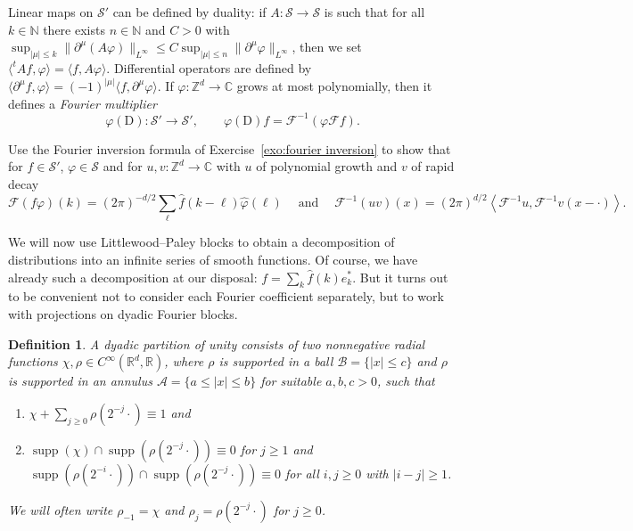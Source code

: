 \documentclass[a4paper,11pt]{article}
\newcommand{\cdummy}{\cdot}
\newcommand{\mathD}{\mathrm{D}}
\newcommand{\nosymbol}{}
\newcommand{\tmop}[1]{\ensuremath{\operatorname{#1}}}
\newcommand{\tmtextit}[1]{{\itshape{#1}}}
\newtheorem{definition}{Definition}
{\theorembodyfont{\rmfamily}\newtheorem{example}{Example}}
{\theorembodyfont{\rmfamily\small}\newtheorem{exercise}{Exercise}}
\newcommand{\CA}{\mathscr{A}}
\newcommand{\CB}{\mathscr{B}}
\newcommand{\CF}{\mathscr{F}}
\newcommand{\CS}{\mathscr{S}}
\begin{document}
Linear maps on $\CS'$ can be defined by duality: if $A : \CS \rightarrow \CS$
is such that for all $k \in \mathbb{N}$ there exists $n \in \mathbb{N}$ and
$C > 0$ with $\sup_{| {\mu} | \leqslant k} \| \partial^{{\mu}} (A
\varphi) \|_{L^{\infty}} \leqslant C \sup_{| {\mu} | \leqslant n} \|
\partial^{{\mu}} \varphi \|_{L^{\infty}}$, then we set $\langle^t A f,
\varphi \rangle = \langle f, A \varphi \rangle$. Differential operators are
defined by $\langle \partial^{{\mu}} f, \varphi \rangle = (- 1)^{|
{\mu} |} \langle f, \partial^{{\mu}} \varphi \rangle$. If $\varphi :
\mathbb{Z}^d \rightarrow \mathbb{C}$ grows at most polynomially, then it
defines a \tmtextit{Fourier multiplier}
\[
   \varphi (\mathD) : \CS' \rightarrow \CS', \hspace{2em} \varphi (\mathD) f = \CF^{- 1} ( \varphi \CF f ).
\]
\begin{exercise}
  \label{exercise:convolution}Use the Fourier inversion formula of
  Exercise~\ref{exo:fourier inversion} to show that for $f \in \CS'$, $\varphi
  \in \CS$ and for $u, v : \mathbb{Z}^d \rightarrow \mathbb{C}$ with $u$ of
  polynomial growth and $v$ of rapid decay
  \[ \CF (f \varphi) (k) = (2 \pi)^{- d / 2} \sum_{\ell} \hat{f} (k - \ell)
     \hat{\varphi} (\ell) \hspace{1em} \tmop{and} \hspace{1em} \CF^{- 1} (u v)
     (x) = (2 \pi)^{d / 2} \left\langle \CF^{- 1} u, \CF^{- 1} v (x - \cdot)
     \right\rangle . \]
\end{exercise}

We will now use Littlewood--Paley blocks to obtain a decomposition of
distributions into an infinite series of smooth functions. Of course, we have
already such a decomposition at our disposal: $f = \sum_k \hat{f} (k)
e^{\ast}_k$. But it turns out to be convenient not to consider each Fourier
coefficient separately, but to work with projections on dyadic Fourier blocks.

\begin{definition}
  A \tmtextit{dyadic partition of unity} consists of two nonnegative radial
  functions $\chi, \rho \in C^{\infty} (\mathbb{R}^d, \mathbb{R})$, where
  $\rho$ is supported in a ball $\CB = \{ | x | \leqslant c \}$ and $\rho$ is
  supported in an annulus $\CA = \{ a \leqslant | x | \leqslant b \}$ for
  suitable $a, b, c > 0$, such that
  \begin{enumerate}
    \item $\chi + \sum_{j \geqslant 0} \rho (2^{- j} \cdummy) \equiv 1$ and
    
    \item \label{property-2-dyadic}$\tmop{supp} (\chi) \cap \tmop{supp} (\rho
    (2^{- j} \cdummy)) \equiv 0$ for $j \geqslant 1$ and $\tmop{supp} (\rho
    (2^{- i} \cdummy)) \cap \tmop{supp} (\rho (2^{- j} \nosymbol \cdummy))
    \equiv 0$ for all $i, j \geqslant 0$ with $| i - j | \geqslant 1$.
  \end{enumerate}
  We will often write $\rho_{- 1} = \chi$ and $\rho_j = \rho (2^{- j}
  \cdummy)$ for $j \geqslant 0$.
\end{definition}
\end{document}
